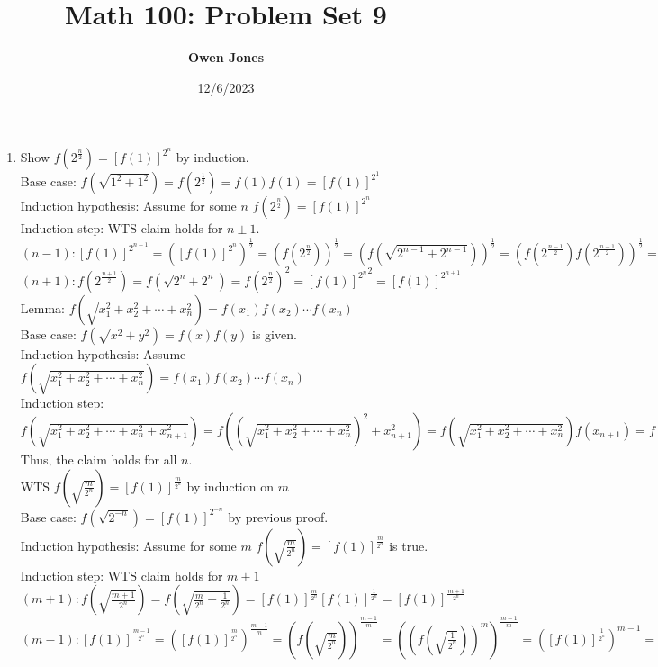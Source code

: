 \documentclass[10pt]{article}
\title{\bf Math 100: Problem Set 9}
\date{12/6/2023}
\author{\bf Owen Jones}
\begin{document}
\maketitle
\begin{enumerate}[label= (Q-\arabic*)]
    \item Show $f(2^\frac{n}{2})={[f(1)]}^{2^n}$ by induction.\\
    Base case: $f(\sqrt{1^2+1^2})=f(2^\frac{1}{2})=f(1)f(1)={[f(1)]}^{2^1}$\\
    Induction hypothesis: Assume for some $n$ $f(2^\frac{n}{2})={[f(1)]}^{2^n}$\\
    Induction step: WTS claim holds for $n\pm 1$.\\
    $(n-1): {[f(1)]}^{2^{n-1}}={({[f(1)]}^{2^n})}^\frac{1}{2}={(f(2^\frac{n}{2}))}^\frac{1}{2}={(f(\sqrt{2^{n-1}+2^{n-1}}))}^\frac{1}{2}={(f(2^{\frac{n-1}{2}})f(2^{\frac{n-1}{2}}))}^\frac{1}{2}=f(2^{\frac{n-1}{2}})$\\
    $(n+1): f(2^\frac{n+1}{2})=f(\sqrt{2^n+2^n})={f(2^\frac{n}{2})}^2={{[f(1)]}^{2^n}}^2={[f(1)]}^{2^{n+1}}$\\
    Lemma: $f(\sqrt{x_1^2+x_2^2+\cdots+x_n^2})=f(x_1)f(x_2)\cdots f(x_n)$\\
    Base case: $f(\sqrt{x^2+y^2})=f(x)f(y)$ is given.\\
    Induction hypothesis: Assume $f(\sqrt{x_1^2+x_2^2+\cdots+x_n^2})=f(x_1)f(x_2)\cdots f(x_n)$\\
    Induction step: $f(\sqrt{x_1^2+x_2^2+\cdots+x_n^2+x_{n+1}^2})=f({(\sqrt{x_1^2+x_2^2+\cdots+x_n^2})}^2+x_{n+1}^2)=f(\sqrt{x_1^2+x_2^2+\cdots+x_n^2})f(x_{n+1})=f(x_1)f(x_2)\cdots f(x_n)f(x_{n+1})$\\
    Thus, the claim holds for all $n$.\\
    WTS $f(\sqrt{\frac{m}{2^n}})={[f(1)]}^{\frac{m}{2^n}}$ by induction on $m$\\
    Base case: $f(\sqrt{2^{-n}})={[f(1)]}^{2^{-n}}$ by previous proof.\\
    Induction hypothesis: Assume for some $m$ $f(\sqrt{\frac{m}{2^n}})={[f(1)]}^{\frac{m}{2^n}}$ is true.\\
    Induction step: WTS claim holds for $m\pm 1$\\
    $(m+1): f(\sqrt{\frac{m+1}{2^n}})=f(\sqrt{\frac{m}{2^n}+\frac{1}{2^n}})={[f(1)]}^{\frac{m}{2^n}}{[f(1)]}^\frac{1}{2^n}={[f(1)]}^\frac{m+1}{2^n}$\\
    $(m-1): {[f(1)]}^\frac{m-1}{2^n}={({[f(1)]}^\frac{m}{2^n})}^\frac{m-1}{m}={(f(\sqrt{\frac{m}{2^n}}))}^\frac{m-1}{m}={({(f(\sqrt{\frac{1}{2^n}}))}^m)}^\frac{m-1}{m}={({[f(1)]}^{\frac{1}{2^n}})}^{m-1}={[f(1)]}^{\frac{m-1}{2^n}}$\\

\end{enumerate}
\end{document}
